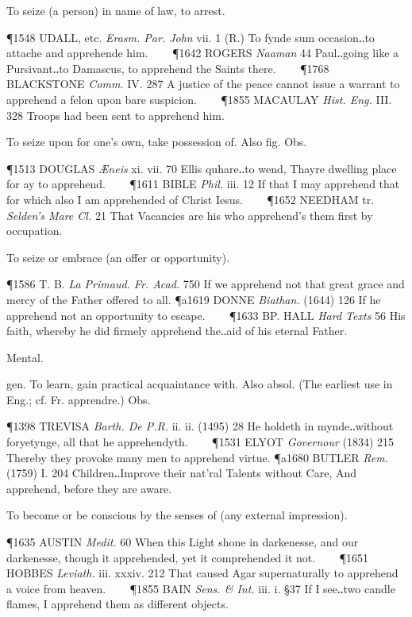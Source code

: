 \begin{description}[wide, labelwidth=!, labelindent=0pt]
\begin{myenumerate}
 To seize (a person) in name of law, to arrest.

\P 1548 UDALL, etc. \textit{Erasm. Par. John} vii. 1 (R.) To fynde sum occasion‥to attache and apprehende him.    
\P 1642 ROGERS  \textit{Naaman} 44 Paul‥going like a Pursivant‥to Damascus, to apprehend the Saints there.    
\P 1768 BLACKSTONE  \textit{Comm.} IV. 287 A justice of the peace cannot issue a warrant to apprehend a felon upon bare suspicion.    
\P 1855 MACAULAY  \textit{Hist. Eng.} III. 328 Troops had been sent to apprehend him.

 To seize upon for one's own, take possession of. Also fig. Obs.

\P 1513 DOUGLAS  \textit{Æneis} xi. vii. 70 Ellis quhare‥to wend, Thayre dwelling place for ay to apprehend.    
\P 1611 BIBLE  \textit{Phil.} iii. 12 If that I may apprehend that for which also I am apprehended of Christ Iesus.    
\P 1652 NEEDHAM tr. \textit{Selden's Mare Cl.} 21 That Vacancies are his who apprehend's them first by occupation.

 To seize or embrace (an offer or opportunity).

\P 1586 T. B. \textit{La Primaud. Fr. Acad.} 750 If we apprehend not that great grace and mercy of the Father offered to all.
\P a1619 DONNE  \textit{Biathan.} (1644) 126 If he apprehend not an opportunity to escape.    
\P 1633 BP. HALL  \textit{Hard Texts} 56 His faith, whereby he did firmely apprehend the‥aid of his eternal Father.

 Mental.

 gen. To learn, gain practical acquaintance with. Also absol. (The earliest use in Eng.; cf. Fr. apprendre.) Obs.

\P 1398 TREVISA  \textit{Barth. De P.R.} ii. ii. (1495) 28 He holdeth in mynde‥without foryetynge, all that he apprehendyth.    
\P 1531 ELYOT  \textit{Governour} (1834) 215 Thereby they provoke many men to apprehend virtue.
\P a1680 BUTLER  \textit{Rem.} (1759) I. 204 Children‥Improve their nat'ral Talents without Care, And apprehend, before they are aware.

 To become or be conscious by the senses of (any external impression).

\P 1635 AUSTIN  \textit{Medit.} 60 When this Light shone in darkenesse, and our darkenesse, though it apprehended, yet it comprehended it not.    
\P 1651 HOBBES  \textit{Leviath.} iii. xxxiv. 212 That caused Agar supernaturally to apprehend a voice from heaven.    
\P 1855 BAIN  \textit{Sens. \& Int.} iii. i. §37 If I see‥two candle flames, I apprehend them as different objects.


\end{myenumerate}
\end{description}
